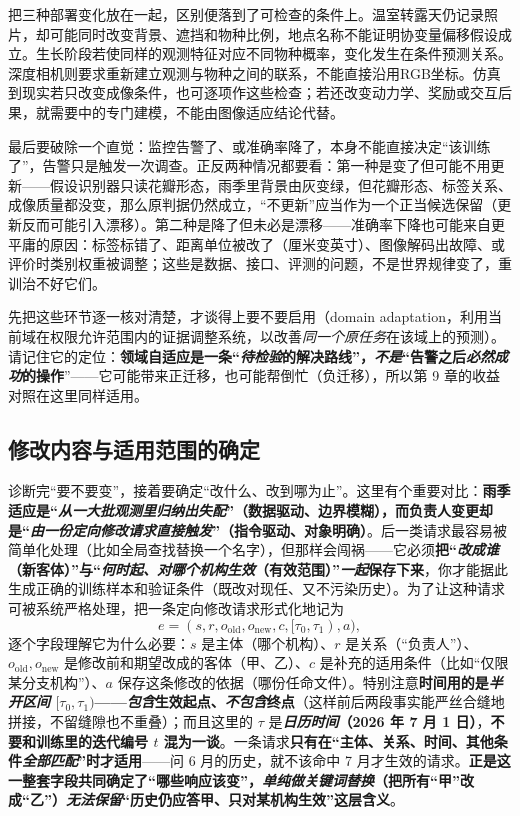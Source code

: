 把三种部署变化放在一起，区别便落到了可检查的条件上。温室转露天仍记录照片，却可能同时改变背景、遮挡和物种比例，地点名称不能证明协变量偏移假设成立。生长阶段若使同样的观测特征对应不同物种概率，变化发生在条件预测关系。深度相机则要求重新建立观测与物种之间的联系，不能直接沿用RGB坐标。仿真到现实若只改变成像条件，也可逐项作这些检查；若还改变动力学、奖励或交互后果，就需要中的专门建模，不能由图像适应结论代替。

最后要破除一个直觉：监控告警了、或准确率降了，本身不能直接决定“该训练了”，告警只是触发一次调查。正反两种情况都要看：第一种是变了但可能不用更新——假设识别器只读花瓣形态，雨季里背景由灰变绿，但花瓣形态、标签关系、成像质量都没变，那么原判据仍然成立，“不更新”应当作为一个正当候选保留（更新反而可能引入漂移）。第二种是降了但未必是漂移——准确率下降也可能来自更平庸的原因：标签标错了、距离单位被改了（厘米变英寸）、图像解码出故障、或评价时类别权重被调整；这些是数据、接口、评测的问题，不是世界规律变了，重训治不好它们。

先把这些环节逐一核对清楚，才谈得上要不要启用（domain adaptation，利用当前域在权限允许范围内的证据调整系统，以改善\emph{同一个原任务}在该域上的预测）。请记住它的定位：\textbf{领域自适应是一条“\emph{待检验}的解决路线”，\emph{不是}“告警之后\emph{必然成功}的操作}”——它可能带来正迁移，也可能帮倒忙（负迁移），所以第 9 章的收益对照在这里同样适用。

\subsection{修改内容与适用范围的确定}
\label{sec:ket-update-scope}

诊断完“要不要变”，接着要确定“改什么、改到哪为止”。这里有个重要对比：\textbf{雨季适应是“\emph{从一大批观测里\emph{归纳}出失配}”（数据驱动、边界模糊），而负责人变更却是“\emph{由一份\emph{定向修改请求}\emph{直接触发}}”（指令驱动、对象明确）}。后一类请求最容易被简单化处理（比如全局查找替换一个名字），但那样会闯祸——它必须\textbf{把“\emph{改成谁}（新客体）”与“\emph{何时起、对\emph{哪个机构}生效}（有效范围）”\emph{一起}保存下来}，你才能据此生成正确的训练样本和验证条件（既改对现任、又不污染历史）。为了让这种请求可被系统严格处理，把一条定向修改请求形式化地记为
\begin{equation}
e=(s,r,o_{\mathrm{old}},o_{\mathrm{new}},c,[\tau_0,\tau_1),a),
\label{eq:ket-update-request}
\end{equation}
逐个字段理解它为什么必要：$s$ 是主体（哪个机构）、$r$ 是关系（“负责人”）、$o_{\mathrm{old}},o_{\mathrm{new}}$ 是修改前和期望改成的客体（甲、乙）、$c$ 是补充的适用条件（比如“仅限某分支机构”）、$a$ 保存这条修改的依据（哪份任命文件）。特别注意\textbf{时间用的是\emph{半开区间} $[\tau_0,\tau_1)$——\emph{包含}生效起点、\emph{不包含}终点}（这样前后两段事实能严丝合缝地拼接，不留缝隙也不重叠）；而且这里的 $\tau$ 是\textbf{\emph{日历时间}（2026 年 7 月 1 日）}，\textbf{不要和训练里的迭代编号 $t$ 混为一谈}。一条请求\textbf{只有在“主体、关系、时间、其他条件\emph{全部匹配}”时才适用}——问 6 月的历史，就不该命中 7 月才生效的请求。\textbf{正是这一整套字段共同确定了“哪些响应该变”，\emph{单纯做关键词替换}（把所有“甲”改成“乙”）\emph{无法保留}“历史仍应答甲、只对某机构生效”这层含义}。

